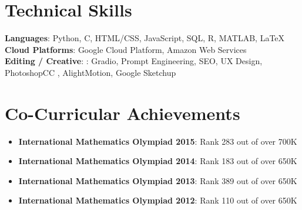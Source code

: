 \documentclass[letterpaper,11pt]{article}
\newcommand{\resumeItem}[1]{\item\small{{#1 \vspace{-2pt}}}}
\newcommand{\resumeSubHeadingListStart}{\begin{itemize}[leftmargin=0.0in, label={}]}
\newcommand{\resumeSubHeadingListEnd}{\end{itemize}}
\begin{document}
\section{\textcolor{myColor1}{Technical Skills}}
 \begin{itemize}[leftmargin=0.08in, label={}]
    \small{\item{
     \textbf{\textcolor{myColor2}{Languages}}{: Python, C, HTML/CSS, JavaScript, SQL, R, MATLAB, LaTeX} \\
     \textbf{\textcolor{myColor2}{Cloud Platforms}}{: Google Cloud Platform, Amazon Web Services} \\
     \textbf{\textcolor{myColor2}{Editing / Creative}}{: : Gradio, Prompt Engineering, SEO, UX Design, PhotoshopCC , AlightMotion, Google Sketchup} \\
    }}
 \end{itemize}
 \vspace{-21pt}  
\section{\textcolor{myColor1}{Co-Curricular Achievements}}
  \resumeSubHeadingListStart
    \resumeItem{\textbf{\textcolor{myColor2}{International Mathematics Olympiad 2015}}: Rank 283 out of over 700K\vspace{-5pt}}
    \resumeItem{\textbf{\textcolor{myColor2}{International Mathematics Olympiad 2014}}: Rank 183 out of over 650K\vspace{-5pt}}
    \resumeItem{\textbf{\textcolor{myColor2}{International Mathematics Olympiad 2013}}: Rank 389 out of over 650K\vspace{-5pt}}
    \resumeItem{\textbf{\textcolor{myColor2}{International Mathematics Olympiad 2012}}: Rank 110 out of over 650K\vspace{-8pt}}
  \resumeSubHeadingListEnd
\end{document}
